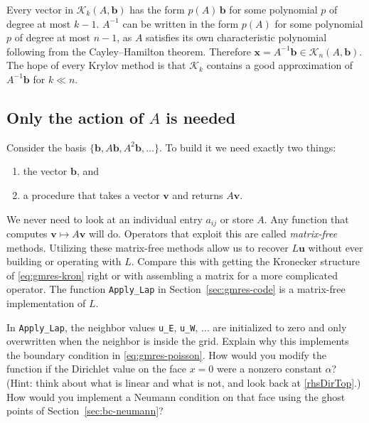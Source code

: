 Every vector in $\mathcal{K}_k(A,\mathbf{b})$ has the form
$p(A)\,\mathbf{b}$ for some polynomial $p$ of degree at most $k-1$. $A^{-1}$ can be written in the form $p(A)$ for some polynomial $p$ of degree at most $n-1$, as $A$ satisfies its own characteristic polynomial following from the Cayley--Hamilton theorem. Therefore
$\mathbf{x} = A^{-1}\mathbf{b} \in \mathcal{K}_n(A,\mathbf{b})$. The hope of
every Krylov method is that $\mathcal{K}_k$ contains a good approximation of $A^{-1}\mathbf{b}$ for $k \ll n$.


\subsection{Only the action of $A$ is needed}
\label{sec:matfree-idea}

Consider the basis $\{\mathbf{b}, A\mathbf{b}, A^2\mathbf{b},\dots\}$.
To build it we need exactly two things:
\begin{enumerate}
  \item the vector $\mathbf{b}$, and
  \item a procedure that takes a vector $\mathbf{v}$ and returns $A\mathbf{v}$.
\end{enumerate}
We never need to look at an individual entry $a_{ij}$ or store $A$. Any function that computes $\mathbf{v}\mapsto A\mathbf{v}$ will do.
Operators that exploit this are called \emph{matrix-free} methods.
 Utilizing these matrix-free methods allow us to recover  $L\mathbf{u}$ without ever building or operating with $L$. Compare this with getting the Kronecker
structure of \eqref{eq:gmres-kron} right or with assembling a matrix for a
more complicated operator. The
function \texttt{Apply\_Lap} in Section~\ref{sec:gmres-code} is a
matrix-free implementation of $L$.

\begin{exercise}
In \texttt{Apply\_Lap}, the neighbor values \texttt{u\_E}, \texttt{u\_W},
$\dots$ are initialized to zero and only overwritten when the neighbor is
inside the grid. Explain why this implements the boundary condition in
\eqref{eq:gmres-poisson}. How would you modify the function if the Dirichlet
value on the face $x = 0$ were a nonzero constant $\alpha$? (Hint: think about
what is linear and what is not, and look back at \eqref{rhsDirTop}.) How would
you implement a Neumann condition on that face using the ghost points of
Section~\ref{sec:bc-neumann}?
\end{exercise}

